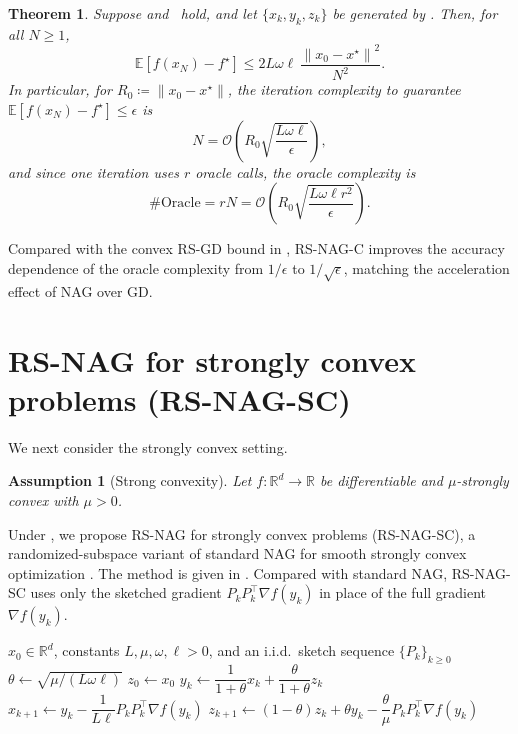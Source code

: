 \documentclass[10pt]{article}
\newtheorem{theorem}{Theorem}[section]
\newtheorem{assumption}[assumption]{Assumption}
\newcommand{\E}{\mathbb{E}}
\newcommand{\R}{\mathbb{R}}
\newcommand{\norm}[1]{\left\|#1\right\|}
\begin{document}
\begin{theorem}
\label{thm:rs-nesterov-convex}
Suppose 
 and~ hold,
and let \(\{x_k,y_k,z_k\}\)  
be generated by
.
Then, for all \(N\ge1\),
\begin{equation}
\E[f(x_N)-f^\star]
\le
2L\omega\ell\,\frac{\norm{x_0-x^\star}^2}{N^2}.
\label{eq:convex-final-rate}
\end{equation}
In particular, for \(R_0\coloneqq\norm{x_0-x^\star}\), the iteration
complexity to guarantee \(\E[f(x_N)-f^\star]\le\epsilon\) is
\[
N
=
\mathcal{O}\!\left(
R_0\sqrt{\frac{L\omega\ell}{\epsilon}}
\right),
\]
and since one iteration uses \(r\) oracle calls, the oracle complexity is
\[
\#\mathrm{Oracle}
=
rN
=
\mathcal{O}\!\left(
R_0\sqrt{\frac{L\omega\ell r^2}{\epsilon}}
\right).
\]
\end{theorem}

Compared with the convex RS-GD bound in
, RS-NAG-C improves the accuracy dependence
of the oracle complexity from \(1/\epsilon\) to \(1/\sqrt{\epsilon}\), matching
the acceleration effect of NAG over GD.



\section{RS-NAG for strongly convex problems (RS-NAG-SC)}
\label{sec:rs-NAG-sc}

We next consider the strongly convex setting.

\begin{assumption}[Strong convexity]
\label{ass:func}
Let \(f:\R^d\to\R\) be differentiable and \(\mu\)-strongly convex with
\(\mu>0\).
\end{assumption}


Under , we propose RS-NAG for strongly convex problems
(RS-NAG-SC), a randomized-subspace variant of standard NAG for smooth strongly
convex optimization \cite{nesterov1983,nesterov2004intro}. The method is given
in . Compared with standard NAG, RS-NAG-SC uses only the
sketched gradient \(P_kP_k^\top\nabla f(y_k)\) in place of the full gradient
\(\nabla f(y_k)\).

\begin{algorithm}[t]
\caption{RS-NAG-SC}
\label{alg:rs-NAG-sc}
\begin{algorithmic}[1]
\Require \(x_0\in\mathbb{R}^d\), constants \(L,\mu,\omega,\ell>0\), and an i.i.d.\ sketch sequence \(\{P_k\}_{k\ge0}\)
\State \(\theta \gets \sqrt{\mu/(L\omega\ell)}\)
\State \(z_0 \gets x_0\)
    \State \(y_k \gets \dfrac{1}{1+\theta}x_k+\dfrac{\theta}{1+\theta}z_k\)
    \State \(x_{k+1} \gets y_k-\dfrac{1}{L\ell}P_kP_k^\top \nabla f(y_k)\)
    \State \(z_{k+1} \gets (1-\theta)z_k+\theta y_k-\dfrac{\theta}{\mu}P_kP_k^\top \nabla f(y_k)\)
\EndFor
\end{algorithmic}
\end{algorithm}
\end{document}
